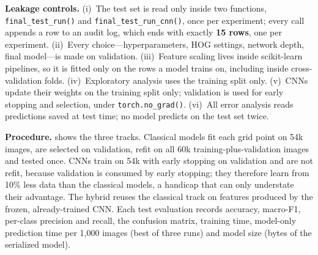 \documentclass[conference]{IEEEtran}
\begin{document}
\textbf{Leakage controls.}
(i)~The test set is read only inside two functions, \texttt{final\_test\_run()} and \texttt{final\_test\_run\_cnn()},
once per experiment; every call appends a row to an audit log, which ends with exactly \textbf{15 rows}, one per
experiment. (ii)~Every choice---hyperparameters, HOG settings, network depth, final model---is made on validation.
(iii)~Feature scaling lives inside scikit-learn pipelines, so it is fitted only on the rows a model trains on, including
inside cross-validation folds. (iv)~Exploratory analysis uses the training split only. (v)~CNNs update their weights on
the training split only; validation is used for early stopping and selection, under \texttt{torch.no\_grad()}.
(vi)~All error analysis reads predictions saved at test time; no model predicts on the test set twice.

\textbf{Procedure.}  shows the three tracks. Classical models fit each grid point on 54k images, are
selected on validation, refit on all 60k training-plus-validation images and tested once. CNNs train on 54k with early
stopping on validation and are not refit, because validation is consumed by early stopping; they therefore learn from
10\% less data than the classical models, a handicap that can only understate their advantage. The hybrid reuses the
classical track on features produced by the frozen, already-trained CNN. Each test evaluation records accuracy,
macro-F1, per-class precision and recall, the confusion matrix, training time, model-only prediction time per 1{,}000
images (best of three runs) and model size (bytes of the serialized model).
\end{document}
